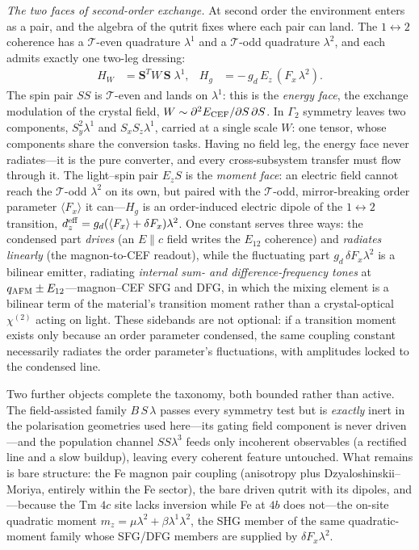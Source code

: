 \documentclass[aps,prb,twocolumn,superscriptaddress,longbibliography]{revtex4-2}
\newcommand{\ve}[1]{\boldsymbol{#1}}
\newcommand{\qafm}{q_{\rm AFM}}
\begin{document}
\emph{The two faces of second-order exchange.}  At second order the
environment enters as a pair, and the algebra of the qutrit fixes
where each pair can land.  The $1\!\leftrightarrow\!2$ coherence has
a $\mathcal T$-even quadrature $\lambda^1$ and a $\mathcal T$-odd
quadrature $\lambda^2$, and each admits exactly one two-leg dressing:
\begin{align}
  H_{W}&=\ve S^{T}W\,\ve S\;\lambda^1,
  &
  H_{g}&=-\,g_d\,E_z\,(F_x\,\lambda^2).
  \label{eq:faces}
\end{align}
The spin pair $SS$ is $\mathcal T$-even and lands on $\lambda^1$:
this is the \emph{energy face}, the exchange modulation of the
crystal field, $W\sim\partial^2E_{\rm CEF}/\partial S\,\partial S$.
In $\Gamma_2$ symmetry leaves two components, $S_y^2\lambda^1$ and
$S_xS_z\lambda^1$, carried at a single scale $W$: one tensor, whose
components share the conversion tasks.  Having no field leg, the
energy face never radiates---it is the pure converter, and every
cross-subsystem transfer must flow through it.  The light--spin pair
$E_zS$ is the \emph{moment face}: an electric field cannot reach the
$\mathcal T$-odd $\lambda^2$ on its own, but paired with the
$\mathcal T$-odd, mirror-breaking order parameter $\langle F_x\rangle$
it can---$H_g$ is an order-induced electric dipole of the
$1\!\leftrightarrow\!2$ transition,
$d_z^{\rm eff}=g_d(\langle F_x\rangle+\delta F_x)\lambda^2$.  One
constant serves three ways: the condensed part \emph{drives} (an
$E\!\parallel\!c$ field writes the $E_{12}$ coherence) and
\emph{radiates linearly} (the magnon-to-CEF readout), while the
fluctuating part $g_d\,\delta F_x\lambda^2$ is a bilinear emitter,
radiating \emph{internal sum- and difference-frequency tones} at
$\qafm\pm E_{12}$---magnon--CEF SFG and DFG, in which the mixing
element is a bilinear term of the material's transition moment rather
than a crystal-optical $\chi^{(2)}$ acting on light.  These sidebands
are not optional: if a transition moment exists only because an order
parameter condensed, the same coupling constant necessarily radiates
the order parameter's fluctuations, with amplitudes locked to the
condensed line.

Two further objects complete the taxonomy, both bounded rather than
active.  The field-assisted family $B\,S\,\lambda$ passes every
symmetry test but is \emph{exactly} inert in the polarisation
geometries used here---its gating field component is never
driven---and the population channel $S S\lambda^3$ feeds only
incoherent observables (a rectified line and a slow buildup), leaving
every coherent feature untouched.  What remains is bare structure:
the Fe magnon pair coupling (anisotropy plus Dzyaloshinskii--Moriya,
entirely within the Fe sector), the bare driven qutrit with its
dipoles, and---because the Tm $4c$ site lacks inversion while Fe at
$4b$ does not---the on-site quadratic moment
$m_z=\mu\lambda^2+\beta\lambda^1\lambda^2$, the SHG member of the
same quadratic-moment family whose SFG/DFG members are supplied by
$\delta F_x\lambda^2$.
\end{document}
